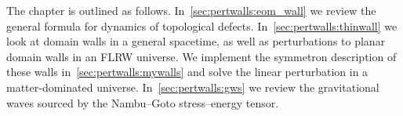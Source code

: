 









The chapter is outlined as follows. In~\cref{sec:pertwalls:eom_wall} we review the general formula for dynamics of topological defects. In~\cref{sec:pertwalls:thinwall} we look at domain walls in a general spacetime, as well as perturbations to planar domain walls in an FLRW universe. We implement the symmetron description of these walls in~\cref{sec:pertwalls:mywalls} and solve the linear perturbation in a matter-dominated universe. In~\cref{sec:pertwalls:gws} we review the gravitational waves sourced by the Nambu--Goto stress--energy tensor.













